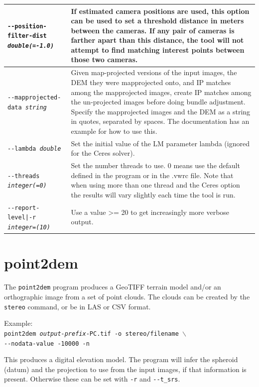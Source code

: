 \begin{longtable}{|p{8cm}|p{9cm}|}
\texttt{-\/-position-filter-dist \textit{double(=-1.0)}} &
If estimated camera positions are used, this option can be used to set a threshold distance in meters
between the cameras.  If any pair of cameras is farther apart than this distance, the tool will not
attempt to find matching interest points between those two cameras.
\\ \hline

\texttt{-\/-mapprojected-data \textit{string}} &
Given map-projected versions of the input images, the DEM they were mapprojected onto, and IP matches among the mapprojected images, create IP matches among the un-projected images before doing bundle adjustment. Specify the mapprojected images and the DEM as a string in quotes, separated by spaces. The documentation has an example for how to use this.
\\ \hline

\texttt{-\/-lambda \textit{double}} & Set the initial value of the LM parameter
lambda (ignored for the Ceres solver).\\ \hline

\texttt{-\/-threads \textit{integer(=0)}} & Set the number threads to use. 0 means use the default defined in the program or in the .vwrc file. Note that when using more than one thread and the Ceres option the results will vary slightly each time the tool is run. \\ \hline

\texttt{-\/-report-level|-r \textit{integer=(10)}} & Use a value >= 20 to
get increasingly more verbose output. \\ \hline
\end{longtable}


\section{point2dem}
\label{point2dem}

The \texttt{point2dem} program produces a GeoTIFF terrain model and/or
an orthographic image from a set of point clouds. The clouds can be
created by the {\tt stereo} command, or be in LAS or CSV format.

Example:\\
\hspace*{2em}\texttt{point2dem \textit{output-prefix}-PC.tif -o stereo/filename $\backslash$} \\
\hspace*{4em}\texttt{-\/-nodata-value -10000 -n}

This produces a digital elevation model. The program will infer the
spheroid (datum) and the projection to use from the input images, if that
information is present. Otherwise these can be set with \texttt{-r} and \texttt{-\/-t\_srs}.

